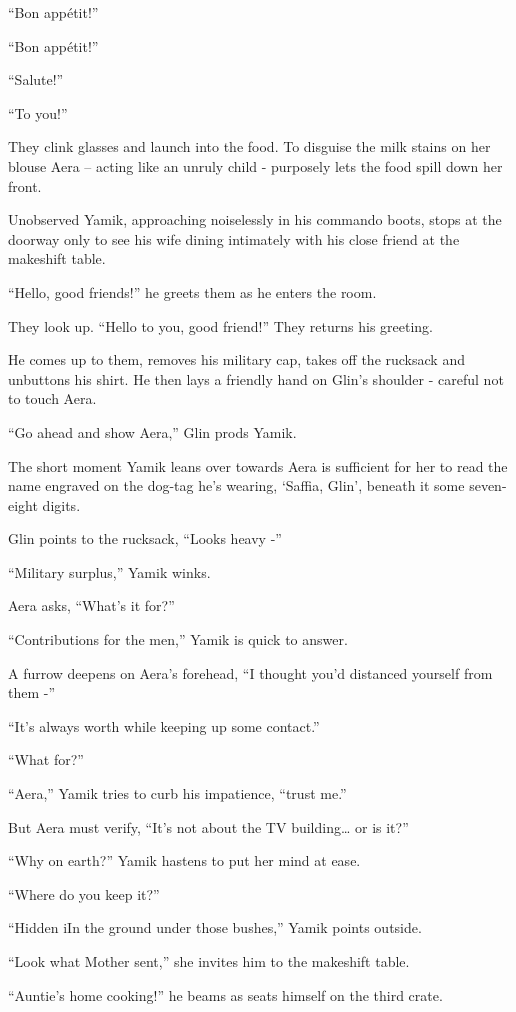 \documentclass[twoside,11pt]{book}
\begin{document}
``Bon app\'etit!''

``Bon app\'etit!''

``Salute!''

``To you!''

They clink glasses and launch into the food. To disguise the milk stains on her blouse Aera -- acting like an unruly
child - purposely lets the food spill down her front.

Unobserved Yamik, approaching noiselessly in his commando boots, stops at the doorway only to see his wife dining
intimately with his close friend at the makeshift table.

``Hello, good friends!'' he greets them as he enters the room.

They look up. ``Hello to you, good friend!'' They returns
his greeting.

He comes up to them, removes his military cap, takes off the rucksack and
unbuttons his shirt. He then lays a friendly hand on Glin's shoulder - careful not to touch Aera.

``Go ahead and show Aera,'' Glin prods Yamik.

The short moment Yamik leans over towards Aera is sufficient for her to read the name engraved on the
dog-tag he's wearing, `Saffia, Glin', beneath it some seven-eight digits.

Glin points to the rucksack, ``Looks heavy -''

``Military surplus,'' Yamik winks.

Aera asks, ``What's it for?''

``Contributions for the men,'' Yamik is quick to answer.

A furrow deepens on Aera's forehead, ``I thought you'd distanced yourself from them -''

``It's always worth while keeping up some contact.''

``What for?''

``Aera,'' Yamik tries to curb his impatience, ``trust me.''

But Aera must verify, ``It's not about the TV building{\dots} or is it?''

``Why on earth?'' Yamik hastens to put her mind at ease.

``Where do you keep it?''

``Hidden iIn the ground under those bushes,'' Yamik points outside.

``Look what Mother sent,'' she invites him to the makeshift table.

``Auntie's home cooking!'' he beams as seats himself on the third crate.
\end{document}
